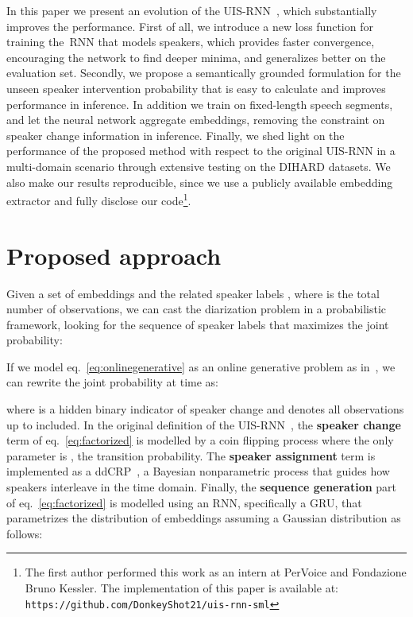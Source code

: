 \documentclass{article}
\begin{document}
In this paper we present an evolution of the UIS-RNN~\cite{zhang2019fully}, which substantially improves the performance. First of all, we introduce a new loss function for training the~\ac{RNN} that models speakers, which provides faster convergence, encouraging the network to find deeper minima, and generalizes better on the evaluation set. Secondly, we propose a semantically grounded formulation for the unseen speaker intervention probability that is easy to calculate and improves performance in inference. In addition we train on fixed-length speech segments, and let the neural network aggregate embeddings,  removing the constraint on speaker change information in inference. Finally, we shed light on the performance of the proposed method with respect to the original UIS-RNN in a multi-domain scenario through extensive testing on the DIHARD datasets. We also make our results reproducible, since we use a publicly available embedding extractor and fully disclose our code\footnote{The first author performed this work as an intern at PerVoice and Fondazione Bruno Kessler. The implementation of this paper is available at:
\tt{https://github.com/DonkeyShot21/uis-rnn-sml}}.





\section{Proposed approach}
\label{sec:proposedapproach}

Given a set of embeddings  
and the related speaker labels , where  is the total number of observations, we can cast the diarization problem in a probabilistic framework, looking for the sequence of speaker labels that maximizes the joint probability:

If we model eq.~\ref{eq:onlinegenerative} as an online generative problem as in~\cite{zhang2019fully}, we can rewrite the joint probability at time  as:

where  is a hidden binary indicator of speaker change and  denotes all observations up to  included. In the original definition of the UIS-RNN~\cite{zhang2019fully}, the {\bf speaker change} term of eq.~\ref{eq:factorized} is modelled by a coin flipping process where the only parameter is , the transition probability. The {\bf speaker assignment} term is implemented as a \ac{ddCRP}~\cite{blei2011distance}, a Bayesian nonparametric process that guides how speakers interleave in the time domain.
Finally, the {\bf sequence generation} part of eq.~\ref{eq:factorized} is modelled using an \ac{RNN}, specifically a \ac{GRU}, that parametrizes the distribution of embeddings assuming a Gaussian distribution as follows:
\end{document}
